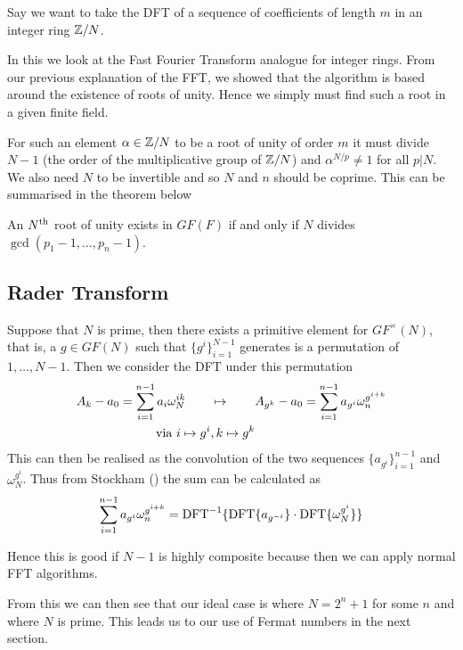 Say we want to take the DFT of a sequence of coefficients of length $m$ in an integer ring ${\mathbb Z}/N$.

In this we look at the Fast Fourier Transform analogue for integer rings. From our previous explanation of the FFT, we showed that the algorithm is based around the existence of roots of unity. Hence we simply must find such a root in a given finite field.

For such an element $\alpha \in {\mathbb Z}/N$ to be a root of unity of order $m$ it must divide $N - 1$ (the order of the multiplicative group of ${\mathbb Z}/N$) and $\alpha^{N/p} \neq 1$ for all $p | N$. We also need $N$ to be invertible and so $N$ and $n$ should be coprime. This can be summarised in the theorem below

\begin{theorem}
    An $N^\textrm{th}$ root of unity exists in $GF(F)$ if and only if $N$ divides $\gcd(p_1 - 1, \ldots, p_n - 1)$.
\end{theorem}


\subsection{Rader Transform}
\label{subsec:rt}

\begin{theorem}\label{rader-tranform}
    Suppose that $N$ is prime, then there exists a primitive element for $GF^\times(N)$, that is, a $g \in GF(N)$ such that $\{g^i\}_{i=1}^{N-1}$ generates is a permutation of $1, \ldots, N-1$. Then we consider the DFT under this permutation
    \begin{align*}
      A_k - a_0 = \sum^{n-1}_{i=1} a_i \omega_N^{ik} \qquad &\mapsto \qquad A_{g^k} - a_0 = \sum^{n-1}_{i=1} a_{g^i}\omega_n^{g^{i+k}}\\
      \textrm{ via } i \mapsto g^i&, k \mapsto g^k
    \end{align*}
    This can then be realised as the convolution of the two sequences $\{a_{g^i}\}_{i=1}^{n-1}$ and $\omega_N^{g^i}$. Thus from Stockham (\cite{stockham}) the sum can be calculated as
    \[
      \sum^{n-1}_{i=1} a_{g^i}\omega_n^{g^{i+k}} = \textrm{DFT}^{-1}\{\textrm{DFT}\{a_{g^{-i}}\}\cdot \textrm{DFT}\{\omega_N^{g^i}\}\}
    \]
\end{theorem}
Hence this is good if $N - 1$ is highly composite because then we can apply normal FFT algorithms.

From this we can then see that our ideal case is where $N = 2^n + 1$ for some $n$ and where $N$ is prime. This leads us to our use of Fermat numbers in the next section.

